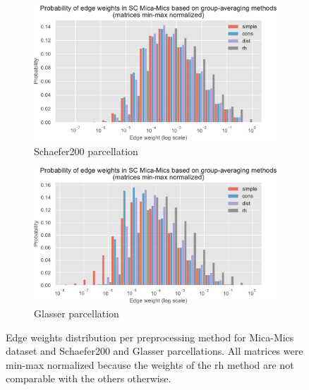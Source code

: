\begin{figure}
\begin{subfigure}{\textwidth}
      \begin{center}
    \includegraphics[width=\textwidth]{images/nootebook_generated/comparing_sc_matrices/schaefer/Probability_of_edge_weights_in_SC_Mica-Mics_based_on_group-averaging_methods_(matrices_min-max_normalized).pdf}
  \end{center}
  \caption{Schaefer200 parcellation}
  \label{fig:edge_weights_schaefer}
\end{subfigure}
\bigskip
\begin{subfigure}{\textwidth}
      \begin{center}
    \includegraphics[width=\textwidth]{images/nootebook_generated/comparing_sc_matrices/MNI-HCP-MMP1/Probability_of_edge_weights_in_SC_Mica-Mics_based_on_group-averaging_methods_(matrices_min-max_normalized).pdf}
  \end{center}
  \caption{Glasser parcellation}
  \label{fig:edge_weights}
\end{subfigure}
\caption[Edge weights distribution per preprocessing method]{Edge weights distribution per preprocessing method for Mica-Mics dataset and Schaefer200 and Glasser parcellations. All matrices were min-max normalized because the weights of the rh method are not comparable with the others otherwise.}
\end{figure}


